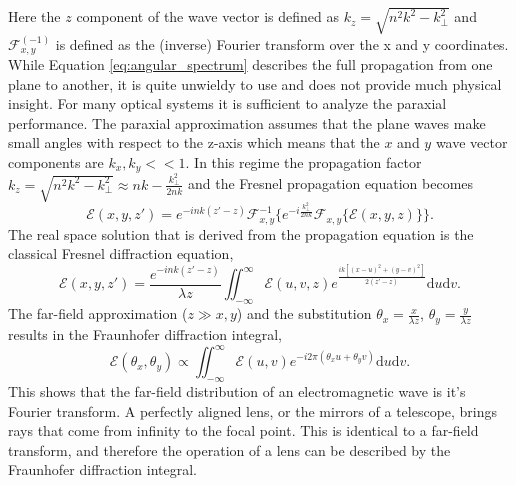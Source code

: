 \documentclass[letterpaper]{ar-1col}
\begin{document}
Here the $z$ component of the wave vector is defined as $k_z=\sqrt{n^2k^2 - k_{\perp}^2}$ and $\mathcal{F}_{x,y}^{(-1)}$ is defined as the (inverse) Fourier transform over the x and y coordinates.
%
While Equation \ref{eq:angular_spectrum} describes the full propagation from one plane to another, it is quite unwieldy to use and does not provide much physical insight.
%
For many optical systems it is sufficient to analyze the paraxial performance.
%
The paraxial approximation assumes that the plane waves make small angles with respect to the z-axis which means that the $x$ and $y$ wave vector components are $k_x,k_y<<1$.
%
In this regime the propagation factor $k_z=\sqrt{n^2k^2 - k_{\perp}^2}\approx nk - \frac{k_{\perp}^2}{2nk}$ and the Fresnel propagation equation becomes
\begin{equation}
\label{eq:angular_spectrum2}
\mathcal{E}(x, y, z') = e^{-ink(z'-z)} \mathcal{F}_{x,y}^{-1}\{ e^{-i\frac{k_{\perp}^2}{2nk}} \mathcal{F}_{x,y}\{\mathcal{E}(x,y,z)\}\}.
\end{equation}
The real space solution that is derived from the propagation equation is the classical Fresnel diffraction equation,
\begin{equation}
\label{eq:fresnel_diffraction}
\mathcal{E}(x, y, z') = \frac{e^{-ink(z'-z)}}{\lambda z} \iint_{-\infty}^{\infty} \mathcal{E}(u, v, z) e^{\frac{ik\left[(x - u)^2 + (y - v)^2\right]}{2 (z' - z)}} \mathrm{d}u \mathrm{d}v.
\end{equation}
The far-field approximation ($z \gg x, y$) and the substitution $\theta_x = \frac{x}{\lambda z}$, $\theta_y = \frac{y}{\lambda z}$ results in the Fraunhofer diffraction integral,
\begin{equation}
\label{eq:fraunhofer_diffraction}
\mathcal{E}(\theta_x, 
\theta_y) \propto \iint_{-\infty}^{\infty} \mathcal{E}(u, v) e^{-i2\pi(\theta_x u + \theta_y v)} \mathrm{d}u \mathrm{d}v.
\end{equation}
This shows that the far-field distribution of an electromagnetic wave is it's Fourier transform. A perfectly aligned lens, or the mirrors of a telescope, brings rays that come from infinity to the focal point. This is identical to a far-field transform, and therefore the operation of a lens can be described by the Fraunhofer diffraction integral.

\end{document}
